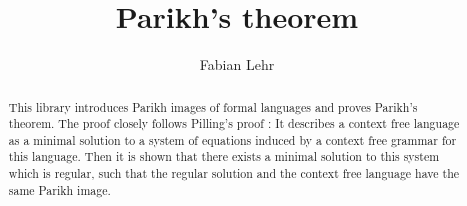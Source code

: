 \documentclass[11pt,a4paper]{article}
\begin{document}
\title{Parikh's theorem}
\author{Fabian Lehr}
\maketitle

\begin{abstract}
  This library introduces Parikh images of formal languages and
  proves Parikh's theorem. The proof closely follows Pilling's proof
  \cite{Pilling}:
  It describes a context free language as a minimal solution to a
  system of equations induced by a context free grammar for this
  language. Then it is shown that there exists a minimal solution
  to this system which is regular, such that the regular solution and the
  context free language have the same Parikh image.
\end{abstract}

\tableofcontents





\end{document}
